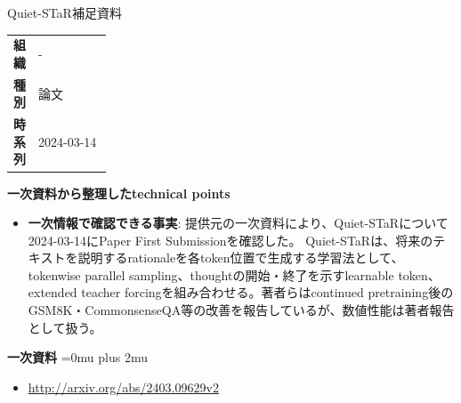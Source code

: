 \begin{technicalnote}{Quiet-STaR}{補足資料}
\begingroup
\begin{tabularx}{\linewidth}{@{}>{\bfseries}p{0.22\linewidth}X@{}}
組織 & - \\
種別 & 論文 \\
時系列 & 2024-03-14 \\
\end{tabularx}
\smallskip
\begin{minipage}{\linewidth}
{\bfseries 一次資料から整理したtechnical points}
\begin{itemize}[leftmargin=1.5em,itemsep=0.35em]
\item \textbf{一次情報で確認できる事実}: 提供元の一次資料により、Quiet-STaRについて2024-03-14にPaper First Submissionを確認した。 Quiet-STaRは、将来のテキストを説明するrationaleを各token位置で生成する学習法として、tokenwise parallel sampling、thoughtの開始・終了を示すlearnable token、extended teacher forcingを組み合わせる。著者らはcontinued pretraining後のGSM8K・CommonsenseQA等の改善を報告しているが、数値性能は著者報告として扱う。
\end{itemize}
\begin{minipage}{\linewidth}
\begin{samepage}
{\bfseries 一次資料}
\begingroup\sloppy
\Urlmuskip=0mu plus 2mu\relax
\begin{itemize}[leftmargin=1.5em,itemsep=0.25em]
\item {\scriptsize\url{http://arxiv.org/abs/2403.09629v2}}
\end{itemize}
\endgroup
\end{samepage}
\end{minipage}
\end{minipage}
\endgroup
\end{technicalnote}
\medskip

